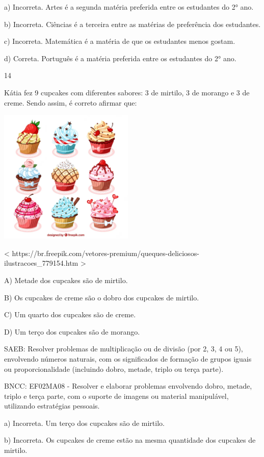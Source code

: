 \begin{escolha}
\begin{escolha}
{{{{a) Incorreta. Artes é a segunda matéria preferida entre os estudantes do 2° ano.

b) Incorreta. Ciências é a terceira entre as matérias de
preferência dos estudantes.

c) Incorreta. Matemática é a matéria de que os estudantes menos gostam.

d) Correta. Português é a matéria preferida entre os estudantes do 2° ano.

\num{14}

Kátia fez 9 cupcakes com diferentes sabores: 3 de mirtilo, 3 de morango
e 3 de creme. Sendo assim, é correto afirmar que:

\includegraphics[width=2.53125in,height=2.53125in]{media/image161.png}

\textless{}
https://br.freepik.com/vetores-premium/queques-deliciosos-ilustracoes\_779154.htm
\textgreater{}

A) Metade dos cupcakes são de mirtilo.

B) Os cupcakes de creme são o dobro dos cupcakes de mirtilo.

C) Um quarto dos cupcakes são de creme.

D) Um terço dos cupcakes são de morango.

SAEB: Resolver problemas de multiplicação ou de divisão (por 2,
3, 4 ou 5), envolvendo números naturais, com os significados de formação
de grupos iguais ou proporcionalidade (incluindo dobro, metade, triplo
ou terça parte).

BNCC: EF02MA08 - Resolver e elaborar
problemas envolvendo dobro, metade, triplo e terça parte, com o suporte
de imagens ou material manipulável, utilizando estratégias pessoais.

a) Incorreta. Um terço dos cupcakes são de mirtilo.

b) Incorreta. Os cupcakes de creme estão na mesma quantidade dos cupcakes de mirtilo.

}}}}
\end{escolha}
\end{escolha}
